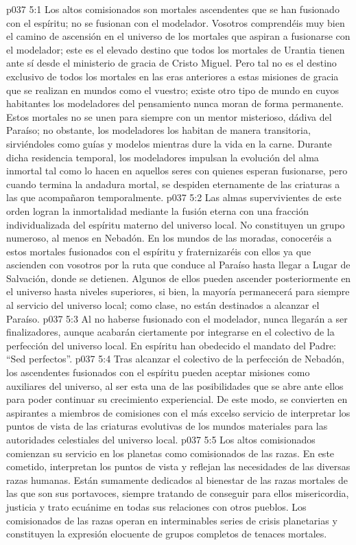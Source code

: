 \vs p037 5:1 Los altos comisionados son mortales ascendentes que se han fusionado con el espíritu; no se fusionan con el modelador. Vosotros comprendéis muy bien el camino de ascensión en el universo de los mortales que aspiran a fusionarse con el modelador; este es el elevado destino que todos los mortales de Urantia tienen ante sí desde el ministerio de gracia de Cristo Miguel. Pero tal no es el destino exclusivo de todos los mortales en las eras anteriores a estas misiones de gracia que se realizan en mundos como el vuestro; existe otro tipo de mundo en cuyos habitantes los modeladores del pensamiento nunca moran de forma permanente. Estos mortales no se unen para siempre con un mentor misterioso, dádiva del Paraíso; no obstante, los modeladores los habitan de manera transitoria, sirviéndoles como guías y modelos mientras dure la vida en la carne. Durante dicha residencia temporal, los modeladores impulsan la evolución del alma inmortal tal como lo hacen en aquellos seres con quienes esperan fusionarse, pero cuando termina la andadura mortal, se despiden eternamente de las criaturas a las que acompañaron temporalmente.
\vs p037 5:2 Las almas supervivientes de este orden logran la inmortalidad mediante la fusión eterna con una fracción individualizada del espíritu materno del universo local. No constituyen un grupo numeroso, al menos en Nebadón. En los mundos de las moradas, conoceréis a estos mortales fusionados con el espíritu y fraternizaréis con ellos ya que ascienden con vosotros por la ruta que conduce al Paraíso hasta llegar a Lugar de Salvación, donde se detienen. Algunos de ellos pueden ascender posteriormente en el universo hasta niveles superiores, si bien, la mayoría permanecerá para siempre al servicio del universo local; como clase, no están destinados a alcanzar el Paraíso.
\vs p037 5:3 Al no haberse fusionado con el modelador, nunca llegarán a ser finalizadores, aunque acabarán ciertamente por integrarse en el colectivo de la perfección del universo local. En espíritu han obedecido el mandato del Padre: “Sed perfectos”.
\vs p037 5:4 \pc Tras alcanzar el colectivo de la perfección de Nebadón, los ascendentes fusionados con el espíritu pueden aceptar misiones como auxiliares del universo, al ser esta una de las posibilidades que se abre ante ellos para poder continuar su crecimiento experiencial. De este modo, se convierten en aspirantes a miembros de comisiones con el más excelso servicio de interpretar los puntos de vista de las criaturas evolutivas de los mundos materiales para las autoridades celestiales del universo local.
\vs p037 5:5 Los altos comisionados comienzan su servicio en los planetas como comisionados de las razas. En este cometido, interpretan los puntos de vista y reflejan las necesidades de las diversas razas humanas. Están sumamente dedicados al bienestar de las razas mortales de las que son sus portavoces, siempre tratando de conseguir para ellos misericordia, justicia y trato ecuánime en todas sus relaciones con otros pueblos. Los comisionados de las razas operan en interminables series de crisis planetarias y constituyen la expresión elocuente de grupos completos de tenaces mortales.
